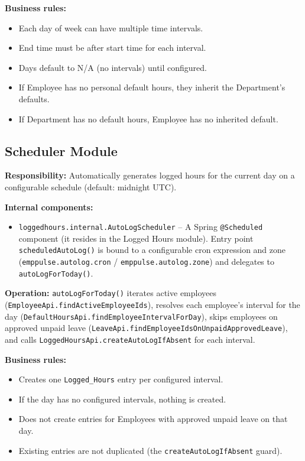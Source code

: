 \documentclass[11pt,a4paper]{article}
\begin{document}
\textbf{Business rules:}
\begin{itemize}[leftmargin=1.5em]
    \item Each day of week can have multiple time intervals.
    \item End time must be after start time for each interval.
    \item Days default to N/A (no intervals) until configured.
    \item If Employee has no personal default hours, they inherit the Department's defaults.
    \item If Department has no default hours, Employee has no inherited default.
\end{itemize}

\subsection{Scheduler Module}

\textbf{Responsibility:} Automatically generates logged hours for the current day on a configurable schedule (default: midnight UTC).

\textbf{Internal components:}
\begin{itemize}[leftmargin=1.5em]
    \item \texttt{loggedhours.internal.AutoLogScheduler} -- A Spring \texttt{@Scheduled} component (it resides in the Logged Hours module). Entry point \texttt{scheduledAutoLog()} is bound to a configurable cron expression and zone (\texttt{emppulse.autolog.cron} / \texttt{emppulse.autolog.zone}) and delegates to \texttt{autoLogForToday()}.
\end{itemize}

\textbf{Operation:} \texttt{autoLogForToday()} iterates active employees (\texttt{EmployeeApi.\allowbreak findActiveEmployeeIds}), resolves each employee's interval for the day (\texttt{DefaultHoursApi.\allowbreak findEmployeeIntervalForDay}), skips employees on approved unpaid leave (\texttt{LeaveApi.\allowbreak findEmployeeIdsOnUnpaidApprovedLeave}), and calls \texttt{LoggedHoursApi.\allowbreak createAutoLogIfAbsent} for each interval.

\textbf{Business rules:}
\begin{itemize}[leftmargin=1.5em]
    \item Creates one \texttt{Logged\_Hours} entry per configured interval.
    \item If the day has no configured intervals, nothing is created.
    \item Does not create entries for Employees with approved unpaid leave on that day.
    \item Existing entries are not duplicated (the \texttt{createAutoLogIfAbsent} guard).
\end{itemize}
\end{document}
